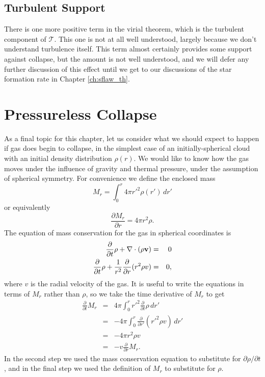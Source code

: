 \subsection{Turbulent Support}

There is one more positive term in the virial theorem, which is the turbulent component of $\mathcal{T}$. This one is not at all well understood, largely because we don't understand turbulence itself. This term almost certainly provides some support against collapse, but the amount is not well understood, and we will defer any further discussion of this effect until we get to our discussions of the star formation rate in Chapter \ref{ch:sflaw_th}.

\section{Pressureless Collapse}
\label{sec:pressureless_collapse}

As a final topic for this chapter, let us consider what we should expect to happen if gas does begin to collapse, in the simplest case of an initially-spherical cloud with an initial density distribution $\rho(r)$. We would like to know how the gas moves under the influence of gravity and thermal pressure, under the assumption of spherical symmetry. For convenience we define the enclosed mass
\begin{equation}
M_r =  \int_0^r 4\pi r'^2 \rho(r') \, dr'
\end{equation}
or equivalently
\begin{equation}
\frac{\partial M_r}{\partial r} = 4\pi r^2 \rho.
\end{equation}
The equation of mass conservation for the gas in spherical coordinates is
\begin{eqnarray}
\frac{\partial}{\partial t} \rho + \nabla\cdot (\rho \mathbf{v}) & = & 0 \\
\frac{\partial}{\partial t} \rho + \frac{1}{r^2}\frac{\partial}{\partial r}(r^2 \rho v) & = & 0,
\end{eqnarray}
where $v$ is the radial velocity of the gas. It is useful to write the equations in terms of $M_r$ rather than $\rho$, so we take the time derivative of $M_r$ to get
\begin{eqnarray}
\frac{\partial}{\partial t}M_r & = & 4\pi \int_{0}^{r} r'^2 \frac{\partial}{\partial t} \rho \,dr' \\
& = & -4\pi \int_{0}^{r} \frac{\partial}{\partial r'}(r'^2 \rho v)\, dr' \\
& = & -4\pi r^2 \rho v \\
& = & -v \frac{\partial}{\partial r}M_r.
\end{eqnarray}
In the second step we used the mass conservation equation to substitute for $\partial \rho/\partial t$, and in the final step we used the definition of $M_r$ to substitute for $\rho$.

